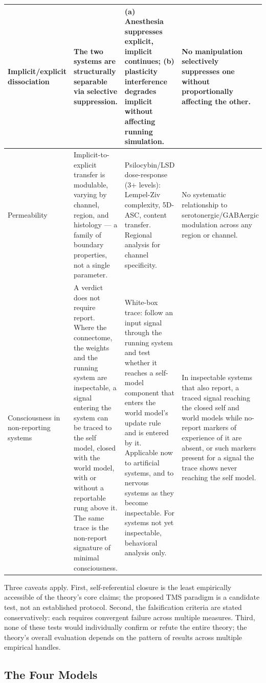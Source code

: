 \documentclass[12pt]{article}
\newcommand{\revend}{}
\begin{document}
{{\begin{xltabular}{\textwidth}{p{2.5cm}XXX}
\midrule
Implicit/explicit dissociation & The two systems are structurally separable via selective suppression. & (a) Anesthesia suppresses explicit, implicit continues; (b) plasticity interference degrades implicit without affecting running simulation. & No manipulation selectively suppresses one without proportionally affecting the other. \\
\midrule
Permeability & Implicit-to-explicit transfer is modulable, varying by channel, region, and histology --- a family of boundary properties, not a single parameter. & Psilocybin/LSD dose-response (3+ levels): Lempel-Ziv complexity, 5D-ASC, content transfer. Regional analysis for channel specificity. & No systematic relationship to serotonergic/GABAergic modulation across any region or channel. \\
\midrule
Consciousness in non-reporting systems & A verdict does not require report. Where the connectome, the weights and the running system are inspectable, a signal entering the system can be traced to the self model, closed with the world model, with or without a reportable rung above it. The same trace is the non-report signature of minimal consciousness. & White-box trace: follow an input signal through the running system and test whether it reaches a self-model component that enters the world model's update rule and is entered by it. Applicable now to artificial systems, and to nervous systems as they become inspectable. For systems not yet inspectable, behavioral analysis only. & In inspectable systems that also report, a traced signal reaching the closed self and world models while no-report markers of experience of it are absent, or such markers present for a signal the trace shows never reaching the self model. \\
\bottomrule
\end{xltabular}}

Three caveats apply. First, self-referential closure is the least empirically accessible of the theory's core claims; the proposed TMS paradigm is a candidate test, not an established protocol. Second, the falsification criteria are stated conservatively: each requires convergent failure across multiple measures. Third, none of these tests would individually confirm or refute the entire theory; the theory's overall evaluation depends on the pattern of results across multiple empirical handles.\revend}


\subsection{The Four Models}
\end{document}
